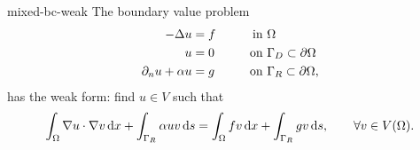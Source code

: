 \begin{Lemma}{mixed-bc-weak}
  The boundary value problem
  \begin{gather}
    \begin{aligned}
      -\Delta u &= f &\qquad \text{in } &\Omega\\
      u &= 0 &\text{on } &\Gamma_D \subset \partial\Omega\\
      \partial_n u + \alpha u &= g &\text{on } &\Gamma_R \subset \partial\Omega,
    \end{aligned}
  \end{gather}
  has the weak form: find $u\in V$ such that
  \begin{gather}
    \int_{\Omega} \nabla u\cdot\nabla v \,\mathrm{d} x
    + \int_{\Gamma_R}\alpha u v \,\mathrm{d} s
    = \int_{\Omega} f v\,\mathrm{d} x
    + \int_{\Gamma_R} g v \,\mathrm{d} s, \qquad\forall v\in V(\Omega).    
  \end{gather}
\end{Lemma}

